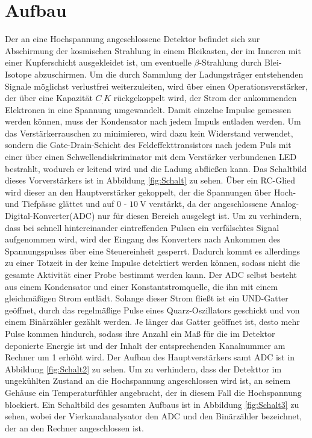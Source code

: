 \section{Aufbau}
\label{sec:Aufbau}

Der an eine Hochspannung angeschlossene Detektor befindet sich zur Abschirmung der kosmischen Strahlung in einem Bleikasten, der im Inneren mit einer Kupferschicht ausgekleidet ist, um eventuelle $\beta$-Strahlung durch Blei-Isotope abzuschirmen. 
Um die durch Sammlung der Ladungsträger entstehenden Signale möglichst verlustfrei weiterzuleiten, wird über einen Operationsverstärker, der über eine Kapazität $C_.K$ rückgekoppelt wird, der Strom der ankommenden Elektronen in eine Spannung umgewandelt. 
Damit einzelne Impulse gemessen werden können, muss der Kondensator nach jedem Impuls entladen werden. Um das Verstärkerrauschen zu minimieren, wird dazu kein Widerstand verwendet, sondern die Gate-Drain-Schicht des Feldeffekttransistors nach jedem Puls mit einer über einen Schwellendiskriminator mit dem Verstärker verbundenen LED bestrahlt, wodurch er leitend wird und die Ladung abfließen kann. Das Schaltbild dieses Vorverstärkers ist in Abbildung \ref{fig:Schalt} zu sehen.
Über ein RC-Glied wird dieser an den Hauptverstärker gekoppelt, der die Spannungen über Hoch- und Tiefpässe glättet und auf $0$ - $\SI{10}{\volt}$ verstärkt, da der angeschlossene Analog-Digital-Konverter(ADC) nur für diesen Bereich ausgelegt ist. Um zu verhindern, dass bei schnell hintereinander eintreffenden Pulsen ein verfälschtes Signal aufgenommen wird, wird der Eingang des Konverters nach Ankommen des Spannungspulses über eine Steuereinheit gesperrt. Dadurch kommt es allerdings zu einer Totzeit in der keine Impulse detektiert werden können, sodass nicht die gesamte Aktivität einer Probe bestimmt werden kann.
Der ADC selbst besteht aus einem Kondensator und einer Konstantstromquelle, die ihn mit einem gleichmäßigen Strom entlädt.
Solange dieser Strom fließt ist ein UND-Gatter geöffnet, durch das regelmäßige Pulse eines Quarz-Oszillators geschickt und von einem Binärzähler gezählt werden.
Je länger das Gatter geöffnet ist, desto mehr Pulse kommen hindurch, sodass ihre Anzahl ein Maß für die im Detektor deponierte Energie ist und der Inhalt der entsprechenden Kanalnummer am Rechner um 1 erhöht wird. Der Aufbau des  Hauptverstärkers samt ADC ist in Abbildung \ref{fig:Schalt2} zu sehen. 
Um zu verhindern, dass der Detekttor im ungekühlten Zustand an die Hochspannung angeschlossen wird ist, an seinem Gehäuse ein Temperaturfühler angebracht, der in diesem Fall die Hochspannung blockiert. Ein Schaltbild des gesamten Aufbaus ist in Abbildung \ref{fig:Schalt3} zu sehen, wobei der Vierkanalanalysator den ADC und den Binärzähler bezeichnet, der an den Rechner angeschlossen ist.

